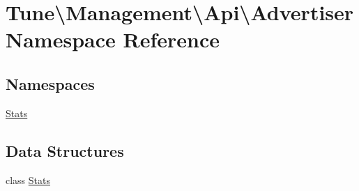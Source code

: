 \hypertarget{namespaceTune_1_1Management_1_1Api_1_1Advertiser}{\section{Tune\textbackslash{}Management\textbackslash{}Api\textbackslash{}Advertiser Namespace Reference}
\label{namespaceTune_1_1Management_1_1Api_1_1Advertiser}
}
\subsection*{Namespaces}
\begin{DoxyCompactItemize}
\item 
\hyperlink{namespaceTune_1_1Management_1_1Api_1_1Advertiser_1_1Stats}{Stats}
\end{DoxyCompactItemize}
\subsection*{Data Structures}
\begin{DoxyCompactItemize}
\item 
class \hyperlink{classTune_1_1Management_1_1Api_1_1Advertiser_1_1Stats}{Stats}
\end{DoxyCompactItemize}
